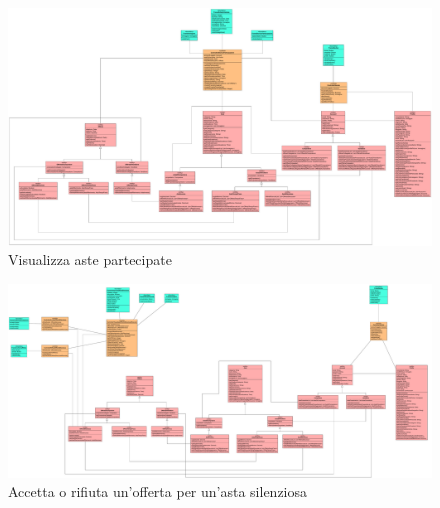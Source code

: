             \begin{figure}[htbp!]
                \centering
                    \includegraphics[width=1\linewidth]{Immagini/Diagrammi/Class Diagram/Utente che ha effettuato l'accesso/VisualizzaStoricoPartecipazioni.pdf}
                \caption{Visualizza aste partecipate}
            \end{figure}
            
            \begin{figure}[htbp!]
                \centering
                    \includegraphics[width=1\linewidth]{Immagini/Diagrammi/Class Diagram/Venditore e compratore/AccettaRifiutaOffertaSilenziosa.pdf}
                \caption{Accetta o rifiuta un'offerta per un'asta silenziosa}
            \end{figure}
            
